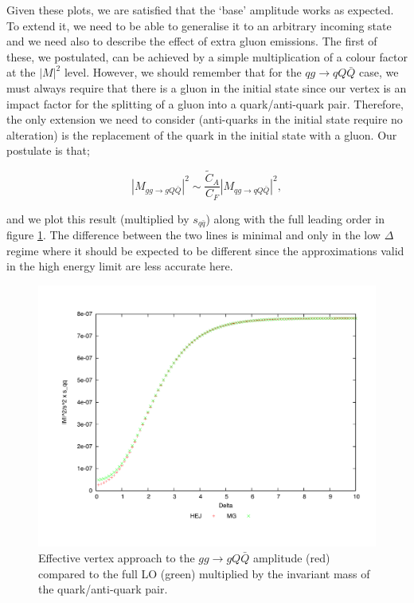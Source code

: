Given these plots, we are satisfied that the `base' amplitude works as expected. To extend it, we need to be able to generalise it to an arbitrary incoming state and we need also to describe the effect of extra gluon emissions. The first of these, we postulated, can be achieved by a simple multiplication of a colour factor at the $|M|^2$ level. However, we should remember that for the $qg \to qQ\bar{Q}$ case, we must always require that there is a gluon in the initial state since our vertex is an impact factor for the splitting of a gluon into a quark/anti-quark pair. Therefore, the only extension we need to consider (anti-quarks in the initial state require no alteration) is the replacement of the quark in the initial state with a gluon. Our postulate is that; 

\begin{equation}
|M_{gg \to gQ\bar{Q}}|^2 \sim \frac{\tilde{C}_A}{C_F} |M_{qg \to qQ\bar{Q}}|^2,
\end{equation}

and we plot this result (multiplied by $s_{q\bar{q}}$) along with the full leading order in figure \ref{fig:gg_qqq}. The difference between the two lines is minimal and only in the low $\Delta$ regime where it should be expected to be different since the approximations valid in the high energy limit are less accurate here. 

\begin{figure}[t]
\centering
\includegraphics[scale=0.45]{Images/gg_gQQx_sqqx_simplecf.pdf}
\caption{Effective vertex approach to the $gg \to gQ\bar{Q}$ amplitude (red) compared to the full LO (green) multiplied by the invariant mass of the quark/anti-quark pair.}
\label{fig:gg_qqq}
\end{figure}

